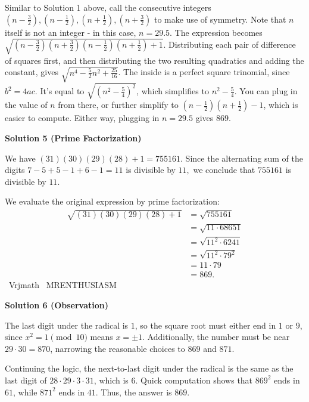 \begin{enumerate}
Similar to Solution 1 above, call the consecutive integers $\left(n-\frac{3}{2}\right), \left(n-\frac{1}{2}\right), \left(n+\frac{1}{2}\right), \left(n+\frac{3}{2}\right)$ to make use of symmetry.  Note that $n$ itself is not an integer - in this case, $n = 29.5$.  The expression becomes $\sqrt{\left(n-\frac{3}{2}\right)\left(n + \frac{3}{2}\right)\left(n - \frac{1}{2}\right)\left(n + \frac{1}{2}\right) + 1}$.  Distributing each pair of difference of squares first, and then distributing the two resulting quadratics and adding the constant, gives $\sqrt{n^4 - \frac{5}{2}n^2 + \frac{25}{16}}$.  The inside is a perfect square trinomial, since $b^2 = 4ac$.  It's equal to $\sqrt{\left(n^2 - \frac{5}{4}\right)^2}$, which simplifies to $n^2 - \frac{5}{4}$.  You can plug in the value of $n$ from there, or further simplify to $\left(n - \frac{1}{2}\right)\left(n + \frac{1}{2}\right) - 1$, which is easier to compute.  Either way, plugging in $n=29.5$ gives $\boxed{869}$.

 



\textbf{Solution 5 (Prime Factorization)}

We have $(31)(30)(29)(28)+1=755161.$ Since the alternating sum of the digits $7-5+5-1+6-1=11$ is divisible by $11,$ we conclude that $755161$ is divisible by $11.$

 We evaluate the original expression by prime factorization:
 \begin{align*} \sqrt{(31)(30)(29)(28)+1}&=\sqrt{755161} \\ &=\sqrt{11\cdot68651} \\ &=\sqrt{11^2\cdot6241} \\ &=\sqrt{11^2\cdot79^2} \\ &=11\cdot79 \\ &=\boxed{869}. \end{align*}
~Vrjmath ~MRENTHUSIASM

 



\textbf{Solution 6 (Observation)}

The last digit under the radical is $1$, so the square root must either end in $1$ or $9$, since $x^2  = 1\pmod {10}$ means $x = \pm 1$.  Additionally, the number must be near $29 \cdot 30 = 870$, narrowing the reasonable choices to $869$ and $871$.

 Continuing the logic, the next-to-last digit under the radical is the same as the last digit of $28 \cdot 29 \cdot 3 \cdot 31$, which is $6$.  Quick computation shows that $869^2$ ends in $61$, while $871^2$ ends in $41$.  Thus, the answer is $\boxed{869}$.


\end{enumerate}
